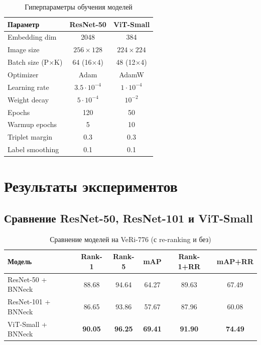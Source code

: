 \begin{table}[H]
\centering
\small
\caption{Гиперпараметры обучения моделей}
\label{tab:hyperparams}
\begin{tabular}{l|c|c}
\hline
\textbf{Параметр} & \textbf{ResNet-50} & \textbf{ViT-Small} \\
\hline
Embedding dim & 2048 & 384 \\
Image size & $256\times128$ & $224\times224$ \\
Batch size (P$\times$K) & 64 (16$\times$4) & 48 (12$\times$4) \\
Optimizer & Adam & AdamW \\
Learning rate & $3.5\cdot10^{-4}$ & $1\cdot10^{-4}$ \\
Weight decay & $5\cdot10^{-4}$ & $10^{-2}$ \\
Epochs & 120 & 50 \\
Warmup epochs & 5 & 10 \\
Triplet margin & 0.3 & 0.3 \\
Label smoothing & 0.1 & 0.1 \\
\hline
\end{tabular}
\end{table}

\section{Результаты экспериментов}

\subsection{Сравнение ResNet-50, ResNet-101 и ViT-Small}

\begin{table}[H]
\centering
\caption{Сравнение моделей на VeRi-776 (с re-ranking и без)}
\label{tab:model_comparison}
\begin{tabular}{l|c|c|c|c|c}
\hline
\textbf{Модель} & \textbf{Rank-1} & \textbf{Rank-5} & \textbf{mAP} & \textbf{Rank-1+RR} & \textbf{mAP+RR} \\
\hline
ResNet-50 + BNNeck  & 88.68 & 94.64 & 64.27 & 89.63 & 67.49 \\
ResNet-101 + BNNeck & 86.65 & 93.86 & 57.67 & 87.96 & 60.08 \\
ViT-Small + BNNeck  & \textbf{90.05} & \textbf{96.25} & \textbf{69.41} & \textbf{91.90} & \textbf{74.49} \\
\hline
\end{tabular}
\end{table}

